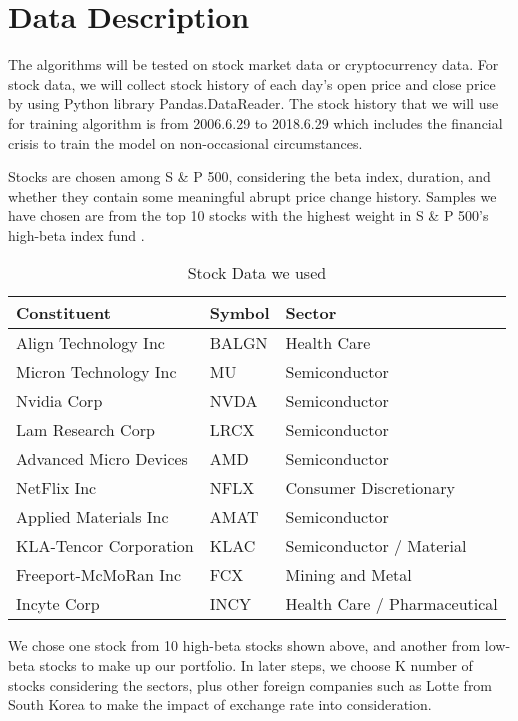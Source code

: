 \chapter{Data Description}
\label{Ch:figures}

The algorithms will be tested on stock market data or cryptocurrency data. For stock data, we will collect stock history of each day’s open price and close price by using Python library Pandas.DataReader. The stock history that we will use for training algorithm is from  2006.6.29 to 2018.6.29 which includes the financial crisis to train the model on non-occasional circumstances. 

Stocks are chosen among S \& P 500, considering the beta index, duration, and whether they contain some meaningful abrupt price change history. Samples we have chosen are from the top 10 stocks with the highest weight in S \& P 500’s high-beta index fund . 
\begin{table}[h]
\begin{center}
\begin{tabular}{|p{2in}|p{1in}|p{2in}|} \hline
Constituent & Symbol & Sector \\ \hline
Align Technology Inc  & BALGN & Health Care\\ \hline
Micron Technology Inc & MU & Semiconductor  \\ \hline
Nvidia Corp & NVDA & Semiconductor  \\ \hline
Lam Research Corp & LRCX & Semiconductor  \\ \hline
Advanced Micro Devices & AMD & Semiconductor  \\ \hline
NetFlix Inc & NFLX & Consumer Discretionary \\ \hline
Applied Materials Inc & AMAT & Semiconductor \\ \hline
KLA-Tencor Corporation & KLAC & Semiconductor / Material \\ \hline
Freeport-McMoRan Inc & FCX & Mining and Metal \\ \hline
Incyte Corp & INCY & Health Care / Pharmaceutical  \\ \hline
\end{tabular}
\caption{Stock Data we used}\label{TABLE:SplitText}
\end{center}
\end{table}

We chose one stock from 10 high-beta stocks shown above, and another from low-beta stocks to make up our portfolio. In later steps, we choose K number of stocks considering the sectors, plus other foreign companies such as Lotte from South Korea to make the impact of exchange rate into consideration.

